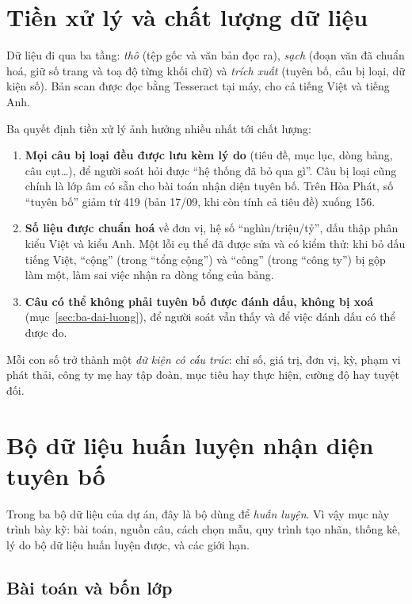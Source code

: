 \section{Tiền xử lý và chất lượng dữ liệu}

Dữ liệu đi qua ba tầng: \emph{thô} (tệp gốc và văn bản đọc ra), \emph{sạch} (đoạn văn đã chuẩn hoá, giữ số trang và toạ độ từng khối chữ) và \emph{trích xuất} (tuyên bố, câu bị loại, dữ kiện số). Bản scan được đọc bằng Tesseract tại máy, cho cả tiếng Việt và tiếng Anh.

Ba quyết định tiền xử lý ảnh hưởng nhiều nhất tới chất lượng:
\begin{enumerate}
\item \textbf{Mọi câu bị loại đều được lưu kèm lý do} (tiêu đề, mục lục, dòng bảng, câu cụt…), để người soát hỏi được “hệ thống đã bỏ qua gì”. Câu bị loại cũng chính là lớp âm có sẵn cho bài toán nhận diện tuyên bố. Trên Hòa Phát, số “tuyên bố” giảm từ 419 (bản 17/09, khi còn tính cả tiêu đề) xuống 156.
\item \textbf{Số liệu được chuẩn hoá} về đơn vị, hệ số “nghìn/triệu/tỷ”, dấu thập phân kiểu Việt và kiểu Anh. Một lỗi cụ thể đã được sửa và có kiểm thử: khi bỏ dấu tiếng Việt, “cộng” (trong “tổng cộng”) và “công” (trong “công ty”) bị gộp làm một, làm sai việc nhận ra dòng tổng của bảng.
\item \textbf{Câu có thể không phải tuyên bố được đánh dấu, không bị xoá} (mục~\ref{sec:ba-dai-luong}), để người soát vẫn thấy và để việc đánh dấu có thể được đo.
\end{enumerate}

Mỗi con số trở thành một \emph{dữ kiện có cấu trúc}: chỉ số, giá trị, đơn vị, kỳ, phạm vi phát thải, công ty mẹ hay tập đoàn, mục tiêu hay thực hiện, cường độ hay tuyệt đối.

\section{Bộ dữ liệu huấn luyện nhận diện tuyên bố}\label{sec:t1}

Trong ba bộ dữ liệu của dự án, đây là bộ dùng để \emph{huấn luyện}. Vì vậy mục này trình bày kỹ: bài toán, nguồn câu, cách chọn mẫu, quy trình tạo nhãn, thống kê, lý do bộ dữ liệu huấn luyện được, và các giới hạn.

\subsection{Bài toán và bốn lớp}

